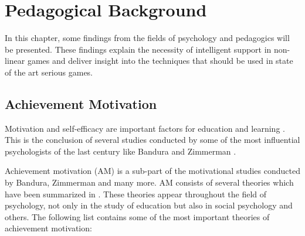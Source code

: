 \chapter{Pedagogical Background}


In this chapter, some findings from the fields of psychology and
pedagogics will be presented. These findings explain the necessity of intelligent support in
non-linear games and deliver insight into the techniques that should be used
in state of the art serious games.

\section{Achievement Motivation}
\label{achievement_motivation}
Motivation and self-efficacy are important factors for education and learning
\cite{Pintrich1990a}.
This is the conclusion of several studies conducted by some of the most
influential psychologists of the last century like Bandura \cite{Bandura1977a, Bandura1991a}
and Zimmerman \cite{Zimmerman1990a, Zimmerman1992a}.

Achievement motivation (AM) is a sub-part of the motivational studies conducted by
Bandura, Zimmerman and many more. AM consists of several theories which have
been summarized in \cite{Blanchard2004b}. These theories appear throughout the
field of psychology, not only in the study of education but also in social
psychology and others. The following list contains some of the most important
theories of achievement motivation:

